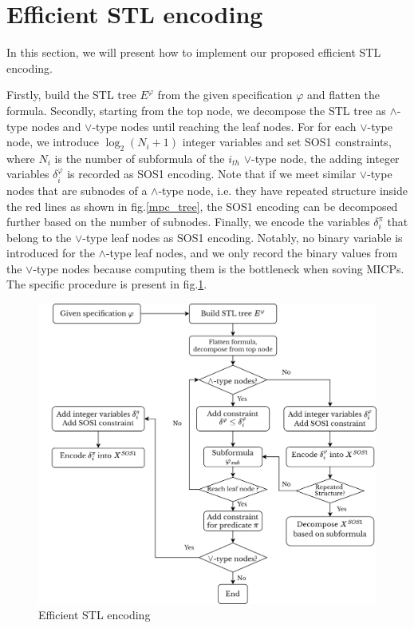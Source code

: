 \documentclass[a4paper]{report}
\begin{document}
\section{Efficient STL encoding}

In this section, we will present how to implement our proposed efficient STL encoding.

Firstly, build the STL tree $E^\varphi$ from the given specification $\varphi$ and flatten the formula. Secondly, starting from the top node, we decompose the STL tree as $\wedge $-type nodes and $\vee$-type nodes until reaching the leaf nodes. For for each $\vee$-type node, we introduce $\log_2(N_i+1)$ integer variables and set SOS1 constraints, where $N_i$ is the number of subformula of the $i_{th}$ $\vee$-type node, 
the adding integer variables $\delta^\varphi_i$ is recorded as SOS1 encoding. Note that if we meet similar $\vee$-type nodes that are subnodes of a $\wedge$-type node, i.e. they have repeated structure inside the red lines as shown in fig.\ref*{mpc_tree}, the SOS1 encoding can be decomposed further based on the number of subnodes. Finally, we encode the variables $\delta^\pi_i$ that belong to the $\vee$-type leaf nodes as SOS1 encoding. Notably, no binary variable is introduced for the $\wedge$-type leaf nodes, and we only record the binary values from the $\vee$-type nodes because computing them is the bottleneck when soving MICPs. The specific procedure is present in fig.\ref*{stl_tree_decomposition}.

\begin{figure}[htbp] \centering 
    \vspace{0.5cm}
    \centering
    \includegraphics[scale=0.55]{stl_tree_decomposition.png}
    \caption{Efficient STL encoding}
    \label{stl_tree_decomposition}

\end{figure} 
\end{document}
